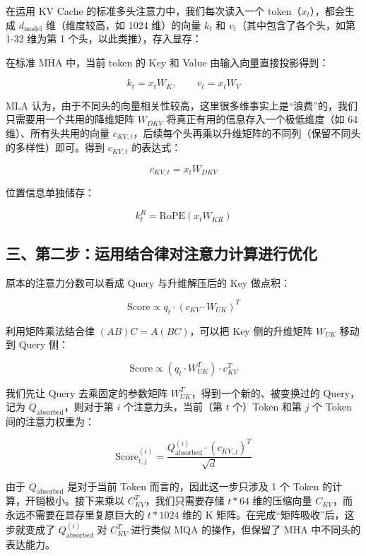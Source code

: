 在运用 KV Cache 的标准多头注意力中，我们每次读入一个 token（\(x_t\)），都会生成 \(d_{\mathrm{model}}\) 维（维度较高，如 1024 维）的向量 \(k_t\) 和 \(v_t\)（其中包含了各个头，如第 1-32 维为第 1 个头，以此类推），存入显存：

在标准 MHA 中，当前 token 的 Key 和 Value 由输入向量直接投影得到：

\[
k_t = x_t W_K,\qquad v_t = x_t W_V
\]

MLA 认为，由于不同头的向量相关性较高，这里很多维事实上是``浪费''的，我们只需要用一个共用的降维矩阵 \(W_{DKV}\) 将真正有用的信息存入一个极低维度（如 64 维）、所有头共用的向量 \(c_{KV,t}\)，后续每个头再乘以升维矩阵的不同列（保留不同头的多样性）即可。得到 \(c_{KV,t}\) 的表达式：

\[
c_{KV,t} = x_t W_{DKV}
\]

位置信息单独储存：

\[
k_t^R = \mathrm{RoPE}(x_t W_{KR})
\]

\hypertarget{ux4e09ux7b2cux4e8cux6b65ux8fd0ux7528ux7ed3ux5408ux5f8bux5bf9ux6ce8ux610fux529bux8ba1ux7b97ux8fdbux884cux4f18ux5316}{%
\subsection{三、第二步：运用结合律对注意力计算进行优化}\label{ux4e09ux7b2cux4e8cux6b65ux8fd0ux7528ux7ed3ux5408ux5f8bux5bf9ux6ce8ux610fux529bux8ba1ux7b97ux8fdbux884cux4f18ux5316}}

原本的注意力分数可以看成 Query 与升维解压后的 Key 做点积：

\[
\mathrm{Score} \propto q_t \cdot (c_{KV} \cdot W_{UK})^T
\]

利用矩阵乘法结合律 \((AB)C=A(BC)\)，可以把 Key 侧的升维矩阵 \(W_{UK}\) 移动到 Query 侧：

\[
\mathrm{Score} \propto (q_t \cdot W_{UK}^T) \cdot c_{KV}^T
\]

我们先让 Query 去乘固定的参数矩阵 \(W_{UK}^T\)，得到一个新的、被变换过的 Query，记为 \(Q_{\mathrm{absorbed}}\)，则对于第 \(i\) 个注意力头，当前（第 \(t\) 个）Token 和第 \(j\) 个 Token 间的注意力权重为：

\[
\mathrm{Score}_{t,j}^{(i)}
=
\frac{Q_{\mathrm{absorbed}}^{(i)} \cdot (c_{KV,j})^T}{\sqrt{d}}
\]

由于 \(Q_{\mathrm{absorbed}}\) 是对于当前 Token 而言的，因此这一步只涉及 1 个 Token 的计算，开销极小。接下来乘以 \(C_{KV}^T\)，我们只需要存储 \(t*64\) 维的压缩向量 \(C_{KV}\)，而永远不需要在显存里复原巨大的 \(t*1024\) 维的 K 矩阵。在完成``矩阵吸收''后，这步就变成了 \(Q_{\mathrm{absorbed}}^{(i)}\) 对 \(C_{KV}^T\) 进行类似 MQA 的操作，但保留了 MHA 中不同头的表达能力。

